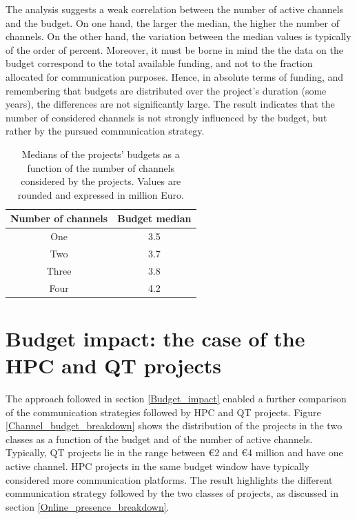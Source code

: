 The analysis suggests a weak correlation between the number of active channels and the budget. On one hand, the larger the median, the higher the number of channels. On the other hand, the variation between the median values is typically of the order of percent. Moreover, it must be borne in mind the the data on the budget correspond to the total available funding, and not to the fraction allocated for communication purposes. Hence, in absolute terms of funding, and remembering that budgets are distributed over the project's duration (some years), the differences are not significantly large. The result indicates that the number of considered channels is not strongly influenced by the budget, but rather by the pursued communication strategy. 

\begin{table}[t]
 \begin{center}
  \begin{tabular}{cc}
   \hline 
   \hline
   Number of channels & Budget median \\ 
   \hline
   \hline
   One & 3.5 \\
   Two & 3.7 \\
   Three & 3.8 \\
   Four & 4.2 \\
   \hline
   \hline
  \end{tabular}
 \end{center} 
 \caption{Medians of the projects' budgets as a function of the number of channels considered by the projects. Values are rounded and expressed in million Euro.}
\label{Median} 
\end{table}

\section{Budget impact: the case of the HPC and QT projects} \label{Budget_impact_the_case_of_the_HPC_and_QT_projects}
The approach followed in section \ref{Budget_impact} enabled a further comparison of the communication strategies followed by HPC and QT projects. Figure \ref{Channel_budget_breakdown} shows the distribution of the projects in the two classes as a function of the budget and of the number of active channels. Typically, QT projects lie in the range between \euro 2 and \euro 4 million and have one active channel. HPC projects in the same budget window have typically considered more communication platforms. The result highlights the different communication strategy followed by the two classes of projects, as discussed in section \ref{Online_presence_breakdown}. 

